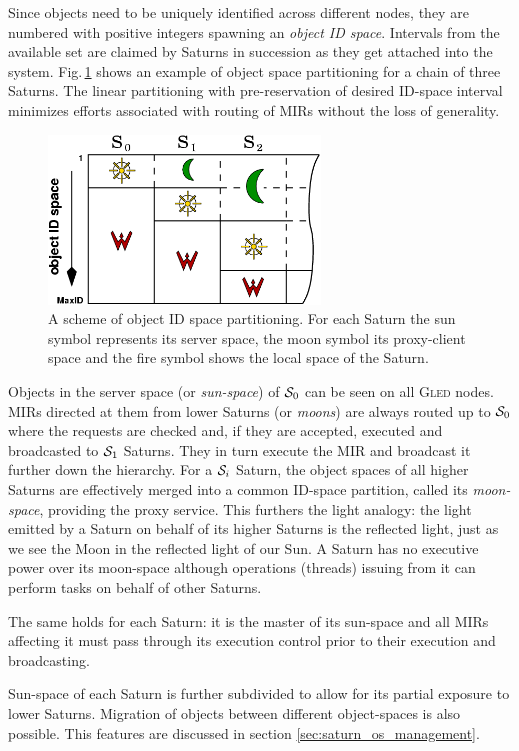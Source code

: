 \documentclass[a4paper,11pt]{article}
\def\gled{\textsc{Gled}\xspace}
\begin{document}
Since objects need to be uniquely identified across different nodes,
they are numbered with positive integers spawning an \emph{object ID
 space}. Intervals from the available set are claimed by Saturns in
succession as they get attached into the system.
Fig.\,\ref{fig:ID_space} shows an example of object space partitioning
for a chain of three Saturns. The linear partitioning with
pre-reservation of desired ID-space interval minimizes efforts
associated with routing of MIRs without the loss of generality.

\begin{figure}
\centering
\includegraphics[height=4.5cm]{figs/ID_space}
\caption{A scheme of object ID space partitioning. For each
  Saturn the sun symbol represents its server space, the moon symbol
  its proxy-client space and the fire symbol shows the local space of
  the Saturn.}
\label{fig:ID_space}
\end{figure}

Objects in the server space (or \emph{sun-space}) of ${\cal S}_0$ can
be seen on all \gled nodes. MIRs directed at them from lower Saturns
(or \emph{moons}) are always routed up to ${\cal S}_0$ where the
requests are checked and, if they are accepted, executed and
broadcasted to ${\cal S}_1$ Saturns. They in turn execute the MIR and
broadcast it further down the hierarchy. For a ${\cal S}_i$ Saturn,
the object spaces of all higher Saturns are effectively merged into a
common ID-space partition, called its \emph{moon-space}, providing the
proxy service. This furthers the light analogy: the light emitted by
a Saturn on behalf of its higher Saturns is the reflected light, just
as we see the Moon in the reflected light of our Sun. A Saturn has no
executive power over its moon-space although operations (threads)
issuing from it can perform tasks on behalf of other Saturns.

The same holds for each Saturn: it is the master of its sun-space and
all MIRs affecting it must pass through its execution control prior to
their execution and broadcasting.

Sun-space of each Saturn is further subdivided to allow for its
partial exposure to lower Saturns. Migration of objects between
different object-spaces is also possible. This features are discussed
in section \ref{sec:saturn_os_management}.
\end{document}
